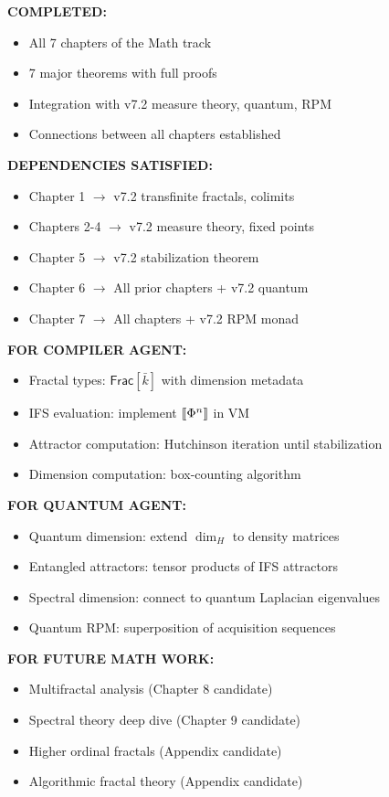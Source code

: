 \begin{tcolorbox}[colback=gray!5!white,colframe=gray!75!black,title=\textbf{v7.3 Math Track Handoff},breakable]

\textbf{COMPLETED:}
\begin{itemize}
  \item All 7 chapters of the Math track
  \item 7 major theorems with full proofs
  \item Integration with v7.2 measure theory, quantum, RPM
  \item Connections between all chapters established
\end{itemize}

\textbf{DEPENDENCIES SATISFIED:}
\begin{itemize}
  \item Chapter 1 $\to$ v7.2 transfinite fractals, colimits
  \item Chapters 2-4 $\to$ v7.2 measure theory, fixed points
  \item Chapter 5 $\to$ v7.2 stabilization theorem
  \item Chapter 6 $\to$ All prior chapters + v7.2 quantum
  \item Chapter 7 $\to$ All chapters + v7.2 RPM monad
\end{itemize}

\textbf{FOR COMPILER AGENT:}
\begin{itemize}
  \item Fractal types: $\mathsf{Frac}[\bar{k}]$ with dimension metadata
  \item IFS evaluation: implement $\llbracket \Phi^{n} \rrbracket$ in VM
  \item Attractor computation: Hutchinson iteration until stabilization
  \item Dimension computation: box-counting algorithm
\end{itemize}

\textbf{FOR QUANTUM AGENT:}
\begin{itemize}
  \item Quantum dimension: extend $\dim_H$ to density matrices
  \item Entangled attractors: tensor products of IFS attractors
  \item Spectral dimension: connect to quantum Laplacian eigenvalues
  \item Quantum RPM: superposition of acquisition sequences
\end{itemize}

\textbf{FOR FUTURE MATH WORK:}
\begin{itemize}
  \item Multifractal analysis (Chapter 8 candidate)
  \item Spectral theory deep dive (Chapter 9 candidate)
  \item Higher ordinal fractals (Appendix candidate)
  \item Algorithmic fractal theory (Appendix candidate)
\end{itemize}


\end{tcolorbox}
